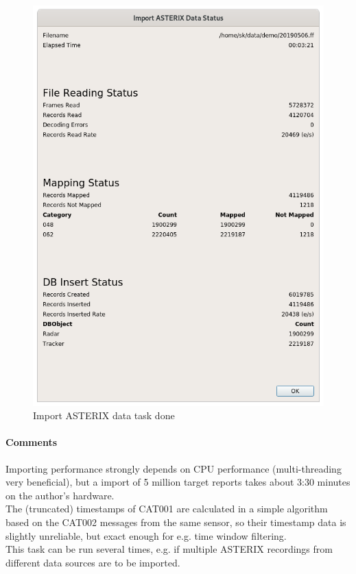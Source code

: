 \begin{figure}[H]
  \center
    \includegraphics[width=12cm]{../screenshots/asterix_import_done.png}
  \caption{Import ASTERIX data task done}
\end{figure}

\paragraph{Comments}
Importing performance strongly depends on CPU performance (multi-threading very beneficial), but a import of 5 million target reports takes about 3:30 minutes on the author's hardware. \\

The (truncated) timestamps of CAT001 are calculated in a simple algorithm based on the CAT002 messages from the same sensor, so their timestamp data is slightly unreliable, but exact enough for e.g. time window filtering. \\

This task can be run several times, e.g. if multiple ASTERIX recordings from different data sources are to be imported. \\


